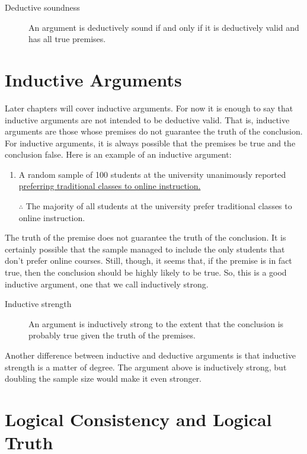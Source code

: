 \documentclass[../logic-text.tex]{subfiles}
\begin{document}
\begin{description}
  \item[Deductive soundness] An argument is deductively sound if and only if it is deductively valid and has all true premises.  
\end{description}


\section{Inductive Arguments}
\label{sec:inductive-arguments}

Later chapters will cover inductive arguments. For now it is enough to say that inductive arguments are not intended to be deductive valid. That is, inductive arguments are those whose premises do not guarantee the truth of the conclusion. For inductive arguments, it is always possible that the premises be true and the conclusion false. Here is an example of an inductive argument:

\begin{enumerate}
	\item A random sample of 100 students at the university unanimously reported \underline{preferring traditional classes to online instruction.} 
	\item [$\therefore$] The majority of all students at the university prefer traditional classes to online instruction.
\end{enumerate}

The truth of the premise does not guarantee the truth of the conclusion. It is certainly possible that the sample managed to include the only students that don't prefer online courses. Still, though, it seems that, if the premise is in fact true, then the conclusion should be highly likely to be true. So, this is a good inductive argument, one that we call inductively strong.

\begin{description}
  \item[Inductive strength] An argument is inductively strong to the extent that the conclusion is probably true given the truth of the premises.
\end{description}

Another difference between inductive and deductive arguments is that inductive strength is a matter of degree. The argument above is inductively strong, but doubling the sample size would make it even stronger.


\section{Logical Consistency and Logical Truth}
\label{sec:logic-cons-truth}
\end{document}
